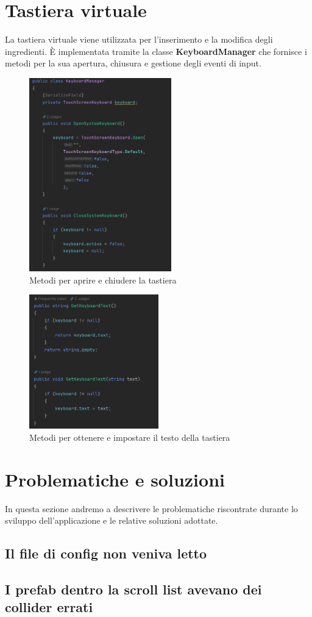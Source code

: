 \section{Tastiera virtuale}
La tastiera virtuale viene utilizzata per l'inserimento e la modifica degli ingredienti. È implementata tramite la classe \textbf{KeyboardManager} che fornisce i metodi per la sua apertura, chiusura e gestione degli eventi di input.
\begin{figure}[H]
    \centering
    \includegraphics[width=0.55\textwidth,height=\textheight,keepaspectratio]{figures/chapter_1/KeyboardManager_OPEN_CLOSE.png}
    \caption{Metodi per aprire e chiudere la tastiera}
    \label{fig:keyboardManagerOpenClose}
\end{figure}
\begin{figure}[H]
    \centering
    \includegraphics[width=0.5\textwidth,height=\textheight,keepaspectratio]{figures/chapter_1/KeyboardManager_GET_SET_TEXT.png}
    \caption{Metodi per ottenere e impostare il testo della tastiera}
    \label{fig:keyboardManagerGetSetText}
\end{figure}

\section{Problematiche e soluzioni}
In questa sezione andremo a descrivere le problematiche riscontrate durante lo sviluppo dell'applicazione e le relative soluzioni adottate.
\subsection{Il file di config non veniva letto}

\subsection{I prefab dentro la scroll list avevano dei collider errati}
